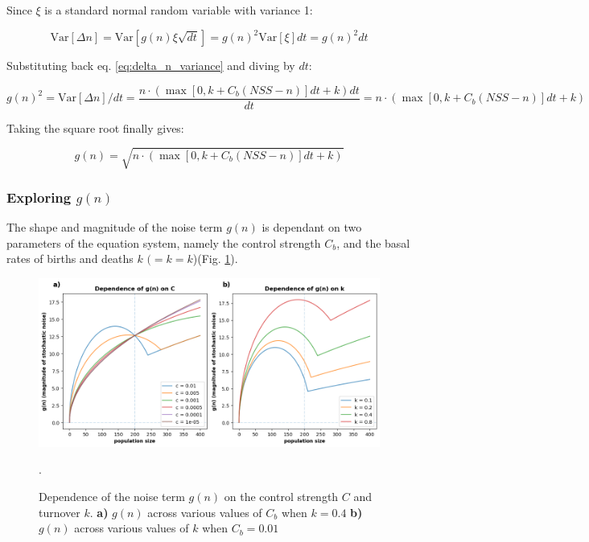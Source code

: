 \documentclass[]{article}
\begin{document}
Since \( \xi \) is a standard normal random variable with variance 1:

\begin{equation}
	\text{Var}[\Delta n] = \text{Var}[g(n) \xi \sqrt{dt}] = g(n)^2 \text{Var}[\xi] dt = g(n)^2 dt
\end{equation}

Substituting back eq. \ref{eq:delta_n_variance} and diving by $dt$:

\begin{equation}
	g(n)^2 = \text{Var}[\Delta n]/dt = \frac{n \cdot (\max [0,k+C_b (NSS-n)] dt + k) dt}{dt} = n \cdot (\max [0,k+C_b (NSS-n)] dt + k)
\end{equation}

Taking the square root finally gives:

\begin{equation} \label{eq:g_n_squared}
	g(n) =  \sqrt{n \cdot (\max [0,k+C_b (NSS-n)] dt + k)}
\end{equation}

\subsubsection{Exploring $g(n)$}

The shape and magnitude of the noise term $g(n)$ is dependant on two parameters of the equation system, namely the control strength $C_b$, and the basal rates of births and deaths $k$ $( = k = k$)(Fig. \ref{fig:noise_depend}).

\begin{figure} [h] 
	\centering %
	\includegraphics[scale=0.65]{figs/noise_dependence} 
	\caption{
		Dependence of the noise term $g(n)$ on the control strength $C$ and turnover $k$. 
		\textbf{a)} $g(n)$ across various values of $C_b$ when $k = 0.4$
		\textbf{b)} $g(n)$ across various values of $k$ when $C_b = 0.01$
	}. 
	\label{fig:noise_depend}
\end{figure}
\end{document}
